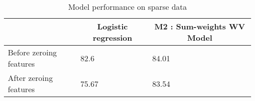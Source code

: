 \begin{table}[htbp]
\centering
\begin{tabular}{l|l|l}
 & \multicolumn{1}{c|}{Logistic regression} & \multicolumn{1}{c}{M2 : Sum-weights WV Model} \\ \hline
Before zeroing features & 82.6 & 84.01 \\
After zeroing features & 75.67 & 83.54
\end{tabular}
\caption{\label{tab:widgets}Model performance on sparse data}
\end{table}
